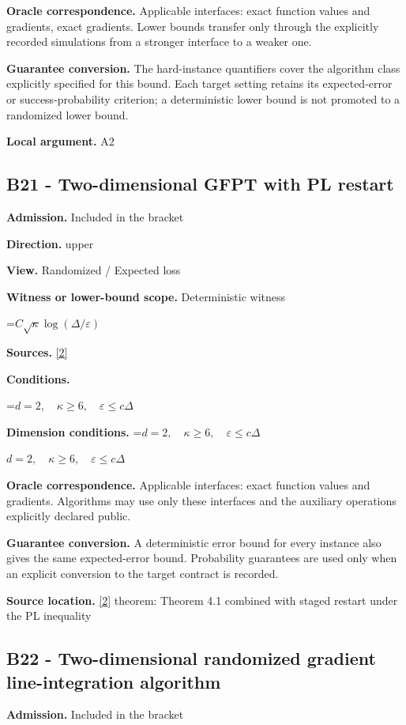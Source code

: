 \documentclass[10pt,a4paper]{article}
\newcommand{\AtlasMath}[1]{\par\begingroup\centering\setbox0=\hbox{$\displaystyle #1$}\ifdim\wd0>1.4\linewidth\typeout{ATLAS WIDE FORMULA: \the\wd0}\fi\ifdim\wd0>\linewidth\resizebox{\linewidth}{!}{\box0}\else\box0\fi\par\endgroup}
\newcommand{\AtlasInlineMath}[1]{\begingroup\setbox0=\hbox{$#1$}\ifdim\wd0>.4\linewidth\endgroup\AtlasMath{#1}\else\endgroup$#1$\fi}
\begin{document}
\textbf{Oracle correspondence.} Applicable interfaces: exact function values and gradients, exact gradients. Lower bounds transfer only through the explicitly recorded simulations from a stronger interface to a weaker one.

\textbf{Guarantee conversion.} The hard-instance quantifiers cover the algorithm class explicitly specified for this bound. Each target setting retains its expected-error or success-probability criterion; a deterministic lower bound is not promoted to a randomized lower bound.

\textbf{Local argument.} A2

\subsection{B21 - Two-dimensional GFPT with PL restart}
\textbf{Admission.} Included in the bracket

\textbf{Direction.} upper

\textbf{View.} Randomized / Expected loss

\textbf{Witness or lower-bound scope.} Deterministic witness

\AtlasMath{C\sqrt\kappa\log(\Delta/\varepsilon)}
\textbf{Sources.} \href{https://arxiv.org/pdf/2310.09157}{[2]}

\textbf{Conditions.} 
\AtlasMath{d=2,\quad\kappa\ge6,\quad\varepsilon\le c\Delta}


\textbf{Dimension conditions.} \AtlasInlineMath{d=2,\quad\kappa\ge6,\quad\varepsilon\le c\Delta}

\textbf{Oracle correspondence.} Applicable interfaces: exact function values and gradients. Algorithms may use only these interfaces and the auxiliary operations explicitly declared public.

\textbf{Guarantee conversion.} A deterministic error bound for every instance also gives the same expected-error bound. Probability guarantees are used only when an explicit conversion to the target contract is recorded.

\textbf{Source location.} \href{https://arxiv.org/pdf/2310.09157}{[2]} theorem: Theorem 4.1 combined with staged restart under the PL inequality

\subsection{B22 - Two-dimensional randomized gradient line-integration algorithm}
\textbf{Admission.} Included in the bracket
\end{document}
